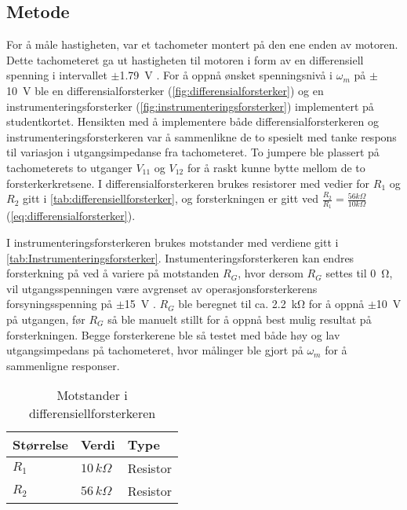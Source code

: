 \subsection{Metode}

For å måle hastigheten, var et tachometer montert på den ene enden av motoren. Dette tachometeret ga ut hastigheten til motoren i form av en differensiell spenning i intervallet $\pm${\SI{1.79}{\volt}} . For å oppnå ønsket spenningsnivå i $\omega_m$ på $\pm${\SI{10}{\volt}} ble en differensialforsterker (\autoref{fig:differensialforsterker}) og en instrumenteringsforsterker (\autoref{fig:instrumenteringsforsterker}) implementert på studentkortet.
Hensikten med å implementere både differensialforsterkeren og instrumenteringsforsterkeren var å sammenlikne de to spesielt med tanke respons til variasjon i utgangsimpedanse fra tachometeret.
To jumpere ble plassert på tachometerets to utganger $V_{11}$ og $V_{12}$ for å raskt kunne bytte mellom de to forsterkerkretsene. I differensialforsterkeren brukes resistorer med vedier for $R_1$ og $R_2$ gitt i \autoref{tab:differensiellforsterker}, og forsterkningen er gitt ved $\frac{R_2}{R_1} = \frac{56k\Omega}{10k\Omega}$(\autoref{eq:differensialforsterker}).

I instrumenteringsforsterkeren brukes motstander med verdiene gitt i \autoref{tab:Instrumenteringsforsterker}. Instumenteringsforsterkeren kan endres forsterkning på ved å variere på motstanden $R_G$, hvor dersom $R_G$ settes til {\SI{0}{\ohm}}, vil utgangsspenningen være avgrenset av operasjonsforsterkerens forsyningsspenning på $\pm${\SI{15}{\volt}} . $R_G$ ble beregnet til ca. {\SI{2.2}{\kilo\ohm}} for å oppnå $\pm${\SI{10}{\volt}} på utgangen, før $R_G$ så ble manuelt stillt for å oppnå best mulig resultat på forsterkningen. Begge forsterkerene ble så testet med både høy og lav utgangsimpedans på tachometeret, hvor målinger ble gjort på $\omega_m$ for å sammenligne responser.

\begin{table}[h]
	\centering
    \caption{Motstander i differensiellforsterkeren}
	\begin{tabular}{lll}
		\toprule
		Størrelse & Verdi & Type \\
		\midrule
        $R_1$ & $10\,k\Omega$& Resistor \\
        $R_2$ & $56\,k\Omega$ & Resistor\\
		\bottomrule
	\end{tabular}
\label{tab:differensiellforsterker}
\end{table}

